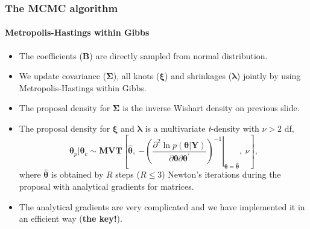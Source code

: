 \documentclass[10pt]{beamer}
\begin{document}
\begin{frame}
  \frametitle{The MCMC algorithm}
  \framesubtitle{Metropolis-Hastings within Gibbs}
  \begin{itemize}
  \item The coefficients ($\bm{B}$) are directly sampled from normal distribution.
  \item We update covariance ($\bm{\Sigma}$), all knots ($\bm{\xi}$) and shrinkages ($\bm{\lambda}$) jointly by using
    Metropolis-Hastings within Gibbs.
  \item  The proposal density for $\bm{\Sigma}$ is the inverse Wishart
    density on previous slide.
  \item The proposal density for $\bm{\xi}$ and $\bm{\lambda}$ is a multivariate \emph{t}-density with $\nu>2$ df,
    \[
    \bm{\theta}_{p}|\bm{\theta}_{c}\sim\bm{MVT}\left[\bm{\hat{\theta}},~\left.-\left(\frac{\partial^{2}\ln
            p(\bm{\theta}|\bm{Y})}{\partial\bm{\theta}\partial\bm{\theta}^{\prime}}\right)^{-1}\right\vert
      _{\bm{\theta}=\bm{\hat{\theta}}},~\nu\right],
    \]
     where $\bm{\hat{\theta}}$ is obtained by $R$ steps ($R\leq 3$) Newton's
      iterations during the proposal with analytical gradients for matrices.

    \item The analytical gradients are very complicated and we have
      implemented it in an efficient way (\textbf{the key!}).

  \end{itemize}
\end{frame}


\end{document}
